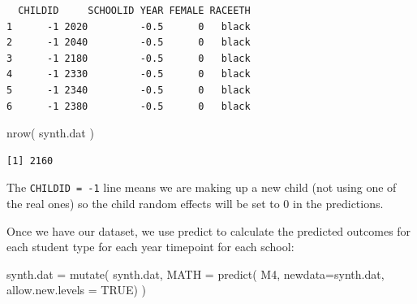 \documentclass[
  letterpaper,
  DIV=11,
  numbers=noendperiod]{scrreprt}
\newenvironment{Shaded}{}{}
\newcommand{\AttributeTok}[1]{\textcolor[rgb]{0.49,0.56,0.16}{#1}}
\newcommand{\ConstantTok}[1]{\textcolor[rgb]{0.53,0.00,0.00}{#1}}
\newcommand{\DecValTok}[1]{\textcolor[rgb]{0.25,0.63,0.44}{#1}}
\newcommand{\FunctionTok}[1]{\textcolor[rgb]{0.02,0.16,0.49}{#1}}
\newcommand{\NormalTok}[1]{#1}
\newcommand{\OtherTok}[1]{\textcolor[rgb]{0.00,0.44,0.13}{#1}}
\newcommand{\SpecialCharTok}[1]{\textcolor[rgb]{0.25,0.44,0.63}{#1}}
\begin{document}
\begin{Shaded}
\end{Shaded}

\begin{verbatim}
  CHILDID     SCHOOLID YEAR FEMALE RACEETH
1      -1 2020         -0.5      0   black
2      -1 2040         -0.5      0   black
3      -1 2180         -0.5      0   black
4      -1 2330         -0.5      0   black
5      -1 2340         -0.5      0   black
6      -1 2380         -0.5      0   black
\end{verbatim}

\begin{Shaded}
\begin{Highlighting}[]
\FunctionTok{nrow}\NormalTok{( synth.dat )}
\end{Highlighting}
\end{Shaded}

\begin{verbatim}
[1] 2160
\end{verbatim}

The \texttt{CHILDID\ =\ -1} line means we are making up a new child (not
using one of the real ones) so the child random effects will be set to 0
in the predictions.

Once we have our dataset, we use predict to calculate the predicted
outcomes for each student type for each year timepoint for each school:

\begin{Shaded}
\begin{Highlighting}[]
\NormalTok{synth.dat }\OtherTok{=} \FunctionTok{mutate}\NormalTok{( synth.dat, }\AttributeTok{MATH =} \FunctionTok{predict}\NormalTok{( M4, }
                                               \AttributeTok{newdata=}\NormalTok{synth.dat,}
                                               \AttributeTok{allow.new.levels =} \ConstantTok{TRUE}\NormalTok{) )}
\end{Highlighting}
\end{Shaded}
\end{document}
